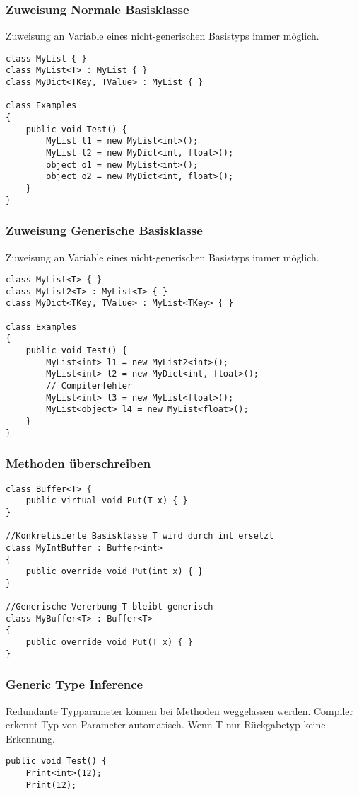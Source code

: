 \begin{multicols*}{2}
\subsubsection{Zuweisung Normale Basisklasse}
Zuweisung an Variable eines nicht-generischen Basistyps immer möglich.
\begin{lstlisting}
class MyList { }
class MyList<T> : MyList { }
class MyDict<TKey, TValue> : MyList { }

class Examples
{
    public void Test() {
        MyList l1 = new MyList<int>();
        MyList l2 = new MyDict<int, float>();
        object o1 = new MyList<int>();
        object o2 = new MyDict<int, float>();
    }
}
\end{lstlisting}
\subsubsection{Zuweisung Generische Basisklasse}
Zuweisung an Variable eines nicht-generischen Basistyps immer möglich.
\begin{lstlisting}
class MyList<T> { }
class MyList2<T> : MyList<T> { }
class MyDict<TKey, TValue> : MyList<TKey> { }

class Examples
{
    public void Test() {
        MyList<int> l1 = new MyList2<int>();
        MyList<int> l2 = new MyDict<int, float>();
        // Compilerfehler
        MyList<int> l3 = new MyList<float>();
        MyList<object> l4 = new MyList<float>();
    }
}
\end{lstlisting}
\subsubsection{Methoden überschreiben}
\begin{lstlisting}
class Buffer<T> {
    public virtual void Put(T x) { }
}

//Konkretisierte Basisklasse T wird durch int ersetzt
class MyIntBuffer : Buffer<int>
{
    public override void Put(int x) { }
}

//Generische Vererbung T bleibt generisch
class MyBuffer<T> : Buffer<T> 
{
    public override void Put(T x) { }
}
\end{lstlisting}
\subsubsection{Generic Type Inference}
Redundante Typparameter können bei Methoden weggelassen werden. Compiler erkennt Typ von Parameter automatisch.
Wenn T nur Rückgabetyp keine Erkennung.
\begin{lstlisting}
public void Test() {
    Print<int>(12);
    Print(12);


\end{lstlisting}
\end{multicols*}
